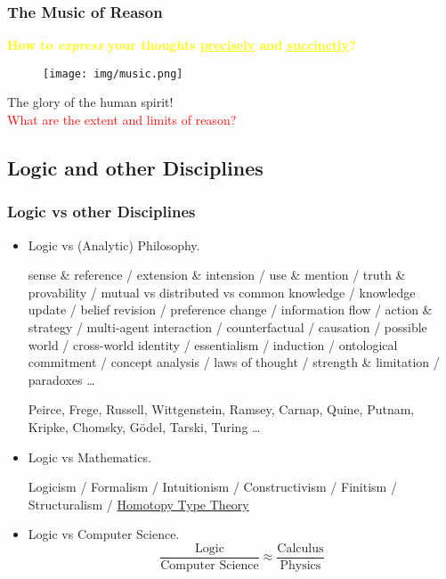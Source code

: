 \documentclass[UTF8,11pt,colorlinks,compress,openany]{beamer}%
\begin{document}
\begin{frame}\frametitle{The Music of Reason}
	\begin{center}
		\large{\textcolor{yellow}{\textbf{How to \textit{express} your thoughts \underline{precisely} and \underline{succinctly}?}}}
	\end{center}
	\begin{figure}
		\texttt{[image: img/music.png]}
	\end{figure}
	\begin{center}
	The glory of the human spirit!\\
	\large{\textcolor{red}{What are the extent and limits of reason?}}
	\end{center}
\end{frame}

\subsection{Logic and other Disciplines}

\begin{frame}\frametitle{Logic vs other Disciplines}
		\begin{itemize}
			\item Logic vs (Analytic) Philosophy.
			
			sense \& reference / extension \& intension / use \& mention / truth \& provability / mutual vs distributed vs common knowledge / knowledge update / belief revision / preference change / information flow / action \& strategy / multi-agent interaction / counterfactual / causation / possible world / cross-world identity / essentialism / induction / ontological commitment / concept analysis / laws of thought / strength \& limitation / paradoxes \dots
			
			Peirce, Frege, Russell, Wittgenstein, Ramsey, Carnap, Quine, Putnam, Kripke, Chomsky, G\"odel, Tarski, Turing \dots
			\item Logic vs Mathematics.
			
			Logicism / Formalism / Intuitionism / Constructivism / Finitism / Structuralism / \href{https://homotopytypetheory.org/book/}{Homotopy Type Theory}
			\item Logic vs Computer Science.
			\[\dfrac{\text{Logic}}{\text{Computer Science}} \approx \dfrac{\text{Calculus}}{\text{Physics}}\]
		\end{itemize}
\end{frame}
\end{document}
